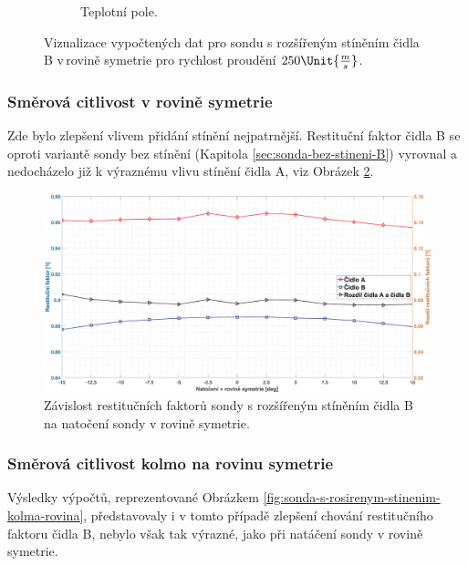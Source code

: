 \begin{figure}[ht!]
\begin{subfigure}{0.45\textwidth}
                    \caption{Teplotní pole.}
                \end{subfigure}
                \caption{Vizualizace vypočtených dat pro sondu s rozšířeným stíněním čidla B v\,rovině symetrie pro rychlost proudění $250 \Unit{\frac{m}{s}}$.}
                \label{fig:sonda-s-rozsirenym-stinenim-B-vizualizace}
            \end{figure}
        \newpage
        \subsubsection{Směrová citlivost v rovině symetrie}
            Zde bylo zlepšení vlivem přidání stínění nejpatrnější. Restituční faktor čidla B se oproti variantě sondy bez stínění (Kapitola \ref{sec:sonda-bez-stineni-B}) vyrovnal a nedocházelo již k výraznému vlivu stínění čidla A, viz Obrázek \ref{fig:sonda-s-rosirenym-stinenim-rovina-symetrie}.
            
            \begin{figure}[ht!]
                \centering
                \includegraphics*[width=\textwidth]{400_SIMULACE_KONSTRUKCNICH_UPRAV/Grafy/03_rovina_symetrie}
                \caption{Závislost restitučních faktorů sondy s rozšířeným stíněním čidla B na natočení sondy v rovině symetrie.}
                \label{fig:sonda-s-rosirenym-stinenim-rovina-symetrie}
            \end{figure}
        \subsubsection{Směrová citlivost kolmo na rovinu symetrie}
            Výsledky výpočtů, reprezentované Obrázkem \ref{fig:sonda-s-rosirenym-stinenim-kolma-rovina}, představovaly i v tomto případě zlepšení chování restitučního faktoru čidla B, nebylo však tak výrazné, jako při natáčení sondy v rovině symetrie.
            
